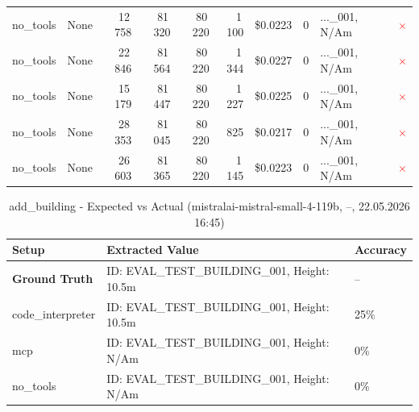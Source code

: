 \documentclass[a4paper,11pt]{article}
\begin{document}
\begin{table}[H]
{\begin{tabular}{l r r r r r r r l c}
no\_tools & None & 12\,758 & 81\,320 & 80\,220 & 1\,100 & \$0.0223 & 0 & ...\_001, N/Am & \textcolor{red}{\(\times\)} \\
no\_tools & None & 22\,846 & 81\,564 & 80\,220 & 1\,344 & \$0.0227 & 0 & ...\_001, N/Am & \textcolor{red}{\(\times\)} \\
no\_tools & None & 15\,179 & 81\,447 & 80\,220 & 1\,227 & \$0.0225 & 0 & ...\_001, N/Am & \textcolor{red}{\(\times\)} \\
no\_tools & None & 28\,353 & 81\,045 & 80\,220 & 825 & \$0.0217 & 0 & ...\_001, N/Am & \textcolor{red}{\(\times\)} \\
no\_tools & None & 26\,603 & 81\,365 & 80\,220 & 1\,145 & \$0.0223 & 0 & ...\_001, N/Am & \textcolor{red}{\(\times\)} \\
\bottomrule
\end{tabular}}
\end{table}

\begin{table}[H]
\centering
\scriptsize
\caption{add\_building - Expected vs Actual (mistralai-mistral-small-4-119b, --, 22.05.2026 16:45)}
\begin{tabular}{l l l}
\toprule
Setup & Extracted Value & Accuracy \\
\midrule
\textbf{Ground Truth} & ID: EVAL\_TEST\_BUILDING\_001, Height: 10.5m & -- \\
\midrule
code\_interpreter & ID: EVAL\_TEST\_BUILDING\_001, Height: 10.5m & 25\% \\
mcp & ID: EVAL\_TEST\_BUILDING\_001, Height: N/Am & 0\% \\
no\_tools & ID: EVAL\_TEST\_BUILDING\_001, Height: N/Am & 0\% \\
\bottomrule
\end{tabular}
\end{table}

\clearpage
\end{document}
